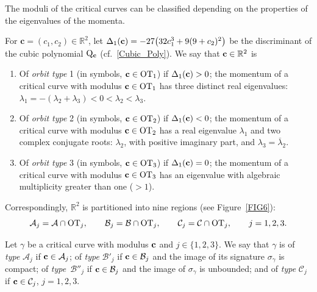 \documentclass[pdftex]{sigma}
\numberwithin{equation}{section}
\def\R{\mathbb{R}}
\begin{document}
The moduli of the critical curves can be classified depending on the properties of the eigenvalues of the momenta.

\begin{Definition}\label{orbittype}
For $\mathbf{c} = (c_1,c_2) \in \R^2$, let $\Delta_1({\bf c})=-27\big(32c_1^3+9(9+c_2)^2\big)$ be the
discriminant of the cubic polynomial ${\rm Q}_{{\bf c}}$ (cf.~\eqref{Cubic_Poly}).
%
We say that
 ${\bf c}\in \R^2$ is
\begin{enumerate}\itemsep=0pt
\item Of \textit{orbit type} 1 (in symbols, ${\bf c}\in {\rm OT}_1$) if $\Delta_1({\bf c})>0$;
the momentum of a critical curve with modulus ${\bf c}\in {\rm OT}_1$ has three distinct real eigenvalues:
$\lambda_1=-(\lambda_2+\lambda_3)<0<\lambda_2<\lambda_3$.
%
\item
Of \textit{orbit type} 2 (in symbols, ${\bf c}\in {\rm OT}_2$) if $\Delta_1({\bf c})<0$;
the momentum of a critical curve
with modulus ${\bf c}\in {\rm OT}_2$ has a real eigenvalue $\lambda_1$ and two complex conjugate roots: $\lambda_2$,
with positive imaginary part, and $\lambda_{3}=\overline{\lambda}_2$.
%
\item Of \textit{orbit type} 3 (in symbols, ${\bf c}\in {\rm OT}_3$) if $\Delta_1({\bf c})=0$;
the momentum of a critical curve with modulus ${\bf c}\in {\rm OT}_3$ has an eigenvalue with algebraic multiplicity
greater than one ($>1$).
\end{enumerate}
\end{Definition}

Correspondingly, $\R^2$ is partitioned into nine regions (see Figure~\ref{FIG6}):
\[
{\mathcal A}_j={\mathcal A}\cap {\rm OT}_j,\qquad {\mathcal B}_j={\mathcal B}\cap {\rm OT}_j,\qquad
 {\mathcal C}_j={\mathcal C}\cap {\rm OT}_j,\qquad j=1,2,3.
\]

\begin{Definition}
Let $\gamma$ be a critical curve with modulus ${\bf c}$ and $j\in \{1,2,3\}$.
We say that $\gamma$ is of \textit{type} ${\mathcal A}_j$ if ${\bf c}\in {\mathcal A}_j$;
of \textit{type} ${\mathcal B}'_j$ if ${\bf c}\in {\mathcal B}_j$
and the image of its signature $\sigma_{\gamma}$ is compact;
of \textit{type}~${\mathcal B}''_j$ if ${\bf c}\in {\mathcal B}_j$ and the image of $\sigma_{\gamma}$ is unbounded;
and
of \textit{type} ${\mathcal C}_j$ if ${\bf c}\in {\mathcal C}_j$, $j=1,2,3$.
\end{Definition}
\end{document}
